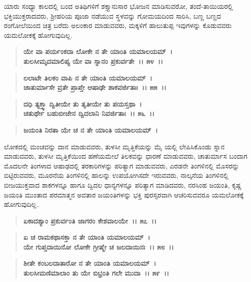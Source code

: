 ಯಾರು ಸಂಧ್ಯಾ ಕಾಲದಲ್ಲಿ ಬಂದ ಅತಿಥಿಗಳಿಗೆ ಶಕ್ತ್ಯಾನುಸಾರ ಭೋಜನ ಮಾಡಿಸುವರೋ, ತಂದೆ-ತಾಯಿಯರಲ್ಲಿ ಭಕ್ತಿಯುಕ್ತರಾದವರು, ಶ‍್ರೀಹರಿಯ ಪೂಜಾ ನಡೆಯುವ ಸ್ಥಳವನ್ನು ಗೋಮಯದಿಂದ ಸಾರಿಸಿ, ಬಣ್ಣ ಬಣ್ಣದ ರಂಗೋಲೆಯಿಂದ ಚಿತ್ರ ಬರೆದು ಅಲಂಕಾರ ಮಾಡುವವರು, ಮಕ್ಕಳಿಗೆ ಹಾಲುತುಪ್ಪ ಇವುಗಳನ್ನು ಕೊಡುವವರು ಯಮಲೋಕಕ್ಕೆ ಹೋಗುವುದಿಲ್ಲ.

\begin{verse}
\textbf{ಯೇ ವಾ ಪರ್ಯಂಕದಾ ಲೋಕೇ ನ ತೇ ಯಾಂತಿ ಯಮಾಲಯಮ್~।}\\\textbf{ತುಲಸೀಮೃದಮಾಲಿಪ್ಯ ಯೇ ವಾ ಸ್ನಾನಂ ಪ್ರಕುರ್ವತೇ~।। ೫೪~।। }
\end{verse}

\begin{verse}
\textbf{ಲಲಾಟೇ ತಿಲಕಂ ವಾಪಿ ನ ತೇ ಯಾಂತಿ ಯಮಾಲಯಮ್~।}\\\textbf{ಚಾತುರ್ಮಾಸೇ ವ್ರತೇ ಪ್ರಾಪ್ತೇ ಆಷಾಢೇ ಶಾಕವರ್ಜಿತಾಃ~।। ೫೫~।।} 
\end{verse}

\begin{verse}
\textbf{ದಧಿ ತ್ಯಕ್ತ್ವಾ ದ್ವಿತೀಯೇ ತು ತೃತೀಯೇ ತು ಪಯಸ್ತಥಾ~।}\\\textbf{ಚತುರ್ಥೇ ಬಹುಬೀಜೇನ ದ್ವಿದಲಾನಿ ನಿವರ್ಜಿತಾಃ~।। ೫೬~।। }
\end{verse}

\begin{verse}
\textbf{ಜಯಂತಿ ನಿರತಾ ಯೇ ಚ ನ ತೇ ಯಾಂತಿ ಯಮಾಲಯಮ್~।}
\end{verse}

ಲೋಕದಲ್ಲಿ ಮಂಚವನ್ನು ದಾನ ಮಾಡುವವರು, ತುಳಸೀ ಮೃತ್ತಿಕೆಯನ್ನು ಮೈ ಯಲ್ಲಿ ಲೇಪಿಸಿಕೊಂಡು ಸ್ನಾನ ಮಾಡುವವರು, ತುಳಸೀ ಮೃತ್ತಿಕೆಯಿಂದ ಹಣೆಯಮೇಲೆ ತಿಲಕವನ್ನು ಧಾರಣೆ ಮಾಡುವವರು, ಚಾತುರ್ಮಾಸ ಬಂದಾಗ ಮೊದಲನೇ ತಿಂಗಳಾದ ಆಷಾಢದಲ್ಲಿ ತರಕಾರಿಗಳನ್ನು ಪರಿತ್ಯಾಗ ಮಾಡುವವರು, ಎರಡನೇ ತಿಂಗಳಿನಲ್ಲಿ ಮೊಸರನ್ನು ಬಿಟ್ಟಿರುವವರು, ಮೂರನೆಯ ತಿಂಗಳಿನಲ್ಲಿ ಹಾಲನ್ನು ಉಪಯೋಗಿಸದೇ ಇರುವವರು, ನಾಲ್ಕನೆಯ ತಿಂಗಳಿನಲ್ಲಿ ಬೀಜಯುಕ್ತವಾದ ಶಾಕಗಳನ್ನೂ ಹಾಗೂ ದ್ವಿದಲ ಧಾನ್ಯಗಳನ್ನೂ ಪರಿತ್ಯಾಗ ಮಾಡಿದವರು, ನರಸಿಂಹ ಜಯಂತಿ, ಕೃಷ್ಣ ಜಯಂತಿ ಮುಂತಾದ ಪರಮಾತ್ಮನ ಅವತಾರ ಜಯಂತಿಗಳನ್ನು ಭಕ್ತಿ ಪುರಸ್ಸರವಾಗಿ ಆಚರಿಸುವವರೂ ಯಮಲೋಕಕ್ಕೆ ಹೋಗುವುದಿಲ್ಲ.

\begin{verse}
\textbf{ಏಕಾದಶ್ಯಾಂ ಪ್ರಕುರ್ವಂತಿ ಜಾಗರಂ ಕೇಶವಾಲಯೇ~।। ೫೭~।। }
\end{verse}

\begin{verse}
\textbf{ಏ ಚ ರಾಮಕಥಾಸಕ್ತಾ ನ ತೇ ಯಾಂತಿ ಯಮಾಲಯಮ್~।}\\\textbf{ಯೇ ಗುಪ್ತದಾಯಿನೋ ಲೋಕೇ ಗ್ರೀಷ್ಮೇ ಚ ಜಲದಾಯಿನಃ~।। ೫೮~।। }
\end{verse}

\begin{verse}
\textbf{ಶೀತೇ ಕಂಬಲದಾತಾರೋ ನ ತೇ ಯಾಂತಿ ಯಮಾಲಯಮ್~।}\\\textbf{ತುಲಸೀಮಣಿಮಾಲಾಂ ತು ಯೇ ಬಿಭ್ರಂತಿ ಗಲೇ ಮುದಾ~।। ೫೯~।। }
\end{verse}

